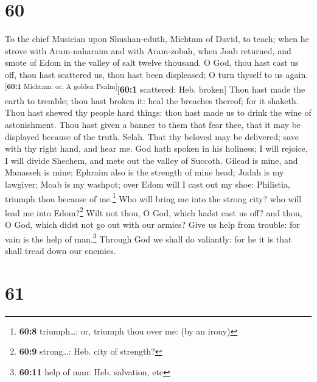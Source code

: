 \hypertarget{section-59}{%
\section{60}\label{section-59}}

To the chief Musician upon Shushan-eduth, Michtam of David, to teach;
when he strove with Aram-naharaim and with Aram-zobah, when Joab
returned, and smote of Edom in the valley of salt twelve thousand.
 O God, thou hast cast us off, thou hast scattered us,
thou hast been displeased; O turn thyself to us
again.\textsuperscript{{[}\textbf{60:1} Michtam: or, A golden
Psalm{]}}{[}\textbf{60:1} scattered: Heb. broken{]}  Thou
hast made the earth to tremble; thou hast broken it: heal the breaches
thereof; for it shaketh.  Thou hast shewed thy people hard
things: thou hast made us to drink the wine of astonishment.
 Thou hast given a banner to them that fear thee, that it
may be displayed because of the truth. Selah.  That thy
beloved may be delivered; save with thy right hand, and hear me.
 God hath spoken in his holiness; I will rejoice, I will
divide Shechem, and mete out the valley of Succoth. 
Gilead is mine, and Manasseh is mine; Ephraim also is the strength of
mine head; Judah is my lawgiver;  Moab is my washpot; over
Edom will I cast out my shoe: Philistia, triumph thou because of
me.\footnote{\textbf{60:8} triumph\ldots: or, triumph thou over me: (by
  an irony)}  Who will bring me into the strong city? who
will lead me into Edom?\footnote{\textbf{60:9} strong\ldots: Heb. city
  of strength?}  Wilt not thou, O God, which hadst cast
us off? and thou, O God, which didst not go out with our armies?
 Give us help from trouble: for vain is the help of
man.\footnote{\textbf{60:11} help of man: Heb. salvation, etc}
 Through God we shall do valiantly: for he it is that
shall tread down our enemies.

\hypertarget{section-60}{%
\section{61}\label{section-60}}

